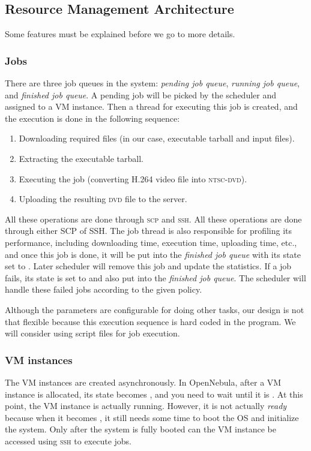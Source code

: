 \subsection{Resource Management Architecture}
Some features must be explained before we go to more details.

\subsubsection{Jobs}
There are three job queues in the system: \emph{pending job queue},
\emph{running job queue}, and \emph{finished job queue}. A pending job
will be picked by the scheduler and assigned to a VM instance. Then a
thread for executing this job is created, and the execution is done in
the following sequence:

\begin{enumerate}
\item Downloading required files (in our case, executable tarball and
  input files).
\item Extracting the executable tarball.
\item Executing the job (converting H.264 video file into
  \textsc{ntsc-dvd}).
\item Uploading the resulting \textsc{dvd} file to the server.
\end{enumerate}

All these operations are done through \textsc{scp} and \textsc{ssh}.
All these operations are done through either SCP of SSH. The job thread
is also responsible for profiling its performance, including downloading
time, execution time, uploading time, etc., and once this job is done,
it will be put into the \emph{finished job queue} with its state set to
\statefinished. Later scheduler will remove this job and update the
statistics. If a job fails, its state is set to \statefailed and also put
into the \emph{finished job queue}. The scheduler will handle these
failed jobs according to the given policy.

Although the parameters are configurable for doing other tasks, our
design is not that flexible because this execution sequence is hard
coded in the program. We will consider using script files for job
execution.


\subsubsection{VM instances}
The VM instances are created asynchronously. In OpenNebula, after a VM
instance is allocated, its state becomes \statepending, and you need
to wait until it is \staterunning. At this point, the VM instance is
actually running. However, it is not actually \emph{ready} because
when it becomes \staterunning, it still needs some time to boot the OS and
initialize the system. Only after the system is fully booted can the
VM instance be accessed using \textsc{ssh} to execute jobs.

